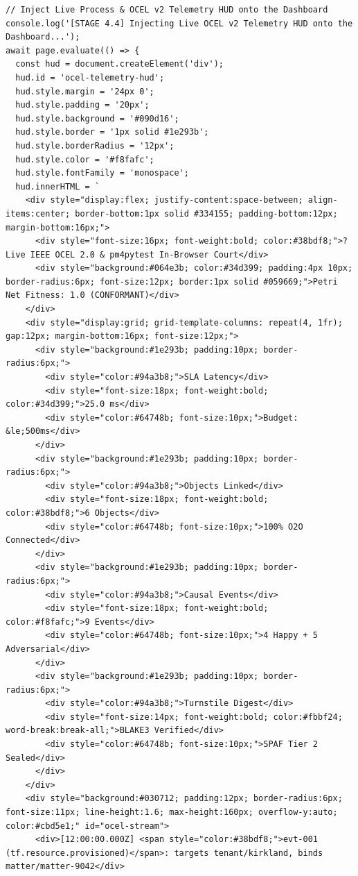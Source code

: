 \documentclass[10pt,twoside,openany]{book}
\theoremstyle{plain}
\theoremstyle{definition}
\theoremstyle{remark}
\begin{document}
\begin{lstlisting}[caption={scripts/run\_full\_process\_playwright.mjs}]
// Inject Live Process & OCEL v2 Telemetry HUD onto the Dashboard
console.log('[STAGE 4.4] Injecting Live OCEL v2 Telemetry HUD onto the Dashboard...');
await page.evaluate(() => {
  const hud = document.createElement('div');
  hud.id = 'ocel-telemetry-hud';
  hud.style.margin = '24px 0';
  hud.style.padding = '20px';
  hud.style.background = '#090d16';
  hud.style.border = '1px solid #1e293b';
  hud.style.borderRadius = '12px';
  hud.style.color = '#f8fafc';
  hud.style.fontFamily = 'monospace';
  hud.innerHTML = `
    <div style="display:flex; justify-content:space-between; align-items:center; border-bottom:1px solid #334155; padding-bottom:12px; margin-bottom:16px;">
      <div style="font-size:16px; font-weight:bold; color:#38bdf8;">? Live IEEE OCEL 2.0 & pm4pytest In-Browser Court</div>
      <div style="background:#064e3b; color:#34d399; padding:4px 10px; border-radius:6px; font-size:12px; border:1px solid #059669;">Petri Net Fitness: 1.0 (CONFORMANT)</div>
    </div>
    <div style="display:grid; grid-template-columns: repeat(4, 1fr); gap:12px; margin-bottom:16px; font-size:12px;">
      <div style="background:#1e293b; padding:10px; border-radius:6px;">
        <div style="color:#94a3b8;">SLA Latency</div>
        <div style="font-size:18px; font-weight:bold; color:#34d399;">25.0 ms</div>
        <div style="color:#64748b; font-size:10px;">Budget: &le;500ms</div>
      </div>
      <div style="background:#1e293b; padding:10px; border-radius:6px;">
        <div style="color:#94a3b8;">Objects Linked</div>
        <div style="font-size:18px; font-weight:bold; color:#38bdf8;">6 Objects</div>
        <div style="color:#64748b; font-size:10px;">100% O2O Connected</div>
      </div>
      <div style="background:#1e293b; padding:10px; border-radius:6px;">
        <div style="color:#94a3b8;">Causal Events</div>
        <div style="font-size:18px; font-weight:bold; color:#f8fafc;">9 Events</div>
        <div style="color:#64748b; font-size:10px;">4 Happy + 5 Adversarial</div>
      </div>
      <div style="background:#1e293b; padding:10px; border-radius:6px;">
        <div style="color:#94a3b8;">Turnstile Digest</div>
        <div style="font-size:14px; font-weight:bold; color:#fbbf24; word-break:break-all;">BLAKE3 Verified</div>
        <div style="color:#64748b; font-size:10px;">SPAF Tier 2 Sealed</div>
      </div>
    </div>
    <div style="background:#030712; padding:12px; border-radius:6px; font-size:11px; line-height:1.6; max-height:160px; overflow-y:auto; color:#cbd5e1;" id="ocel-stream">
      <div>[12:00:00.000Z] <span style="color:#38bdf8;">evt-001 (tf.resource.provisioned)</span>: targets tenant/kirkland, binds matter/matter-9042</div>

\end{lstlisting}
\end{document}
